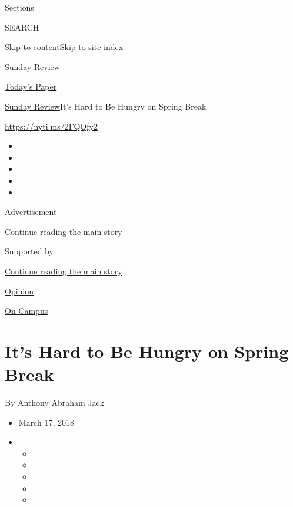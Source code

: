 Sections

SEARCH

\protect\hyperlink{site-content}{Skip to
content}\protect\hyperlink{site-index}{Skip to site index}

\href{https://www.nytimes.com/section/opinion/sunday}{Sunday Review}

\href{https://myaccount.nytimes.com/auth/login?response_type=cookie\&client_id=vi}{}

\href{https://www.nytimes.com/section/todayspaper}{Today's Paper}

\href{/section/opinion/sunday}{Sunday Review}\textbar{}It's Hard to Be
Hungry on Spring Break

\href{https://nyti.ms/2FQQfy2}{https://nyti.ms/2FQQfy2}

\begin{itemize}
\item
\item
\item
\item
\item
\end{itemize}

Advertisement

\protect\hyperlink{after-top}{Continue reading the main story}

Supported by

\protect\hyperlink{after-sponsor}{Continue reading the main story}

\href{/section/opinion}{Opinion}

\href{/column/on-campus}{On Campus}

\hypertarget{its-hard-to-be-hungry-on-spring-break}{%
\section{It's Hard to Be Hungry on Spring
Break}\label{its-hard-to-be-hungry-on-spring-break}}

By Anthony Abraham Jack

\begin{itemize}
\item
  March 17, 2018
\item
  \begin{itemize}
  \item
  \item
  \item
  \item
  \item
  \end{itemize}
\end{itemize}

